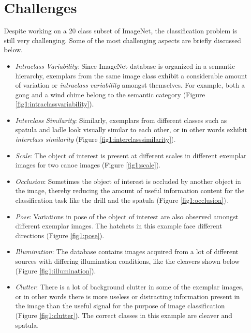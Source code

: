 \documentclass[12pt]{article}
\begin{document}
\section{Challenges}
Despite working on a 20 class subset of ImageNet, the classification problem is still very challenging.
Some of the most challenging aspects are briefly discussed below.

\begin{itemize}
\item \textit{Intraclass Variability}:
Since ImageNet database is organized in a semantic hierarchy, exemplars from the same image class exhibit a considerable amount of variation or \textit{intraclass variability} amongst themselves.
For example, both a gong and a wind chime belong to the semantic category (Figure \ref{fig1:intraclassvariability}).

\item \textit{Interclass Similarity}:
Similarly, exemplars from different classes such as spatula and ladle look visually similar to each other, or in other words exhibit \textit{interclass similarity} (Figure \ref{fig1:interclasssimilarity}).

\item \textit{Scale}:
The object of interest is present at different scales in different exemplar images for two canoe images (Figure \ref{fig1:scale}).

\item \textit{Occlusion}: Sometimes the object of interest is occluded by another object in the image, thereby reducing the amount of useful information content for the classification task like the drill and the spatula (Figure \ref{fig1:occlusion}).

\item \textit{Pose}:
Variations in pose of the object of interest are also observed amongst different exemplar images. The hatchets in this example face different directions (Figure \ref{fig1:pose}).

\item \textit{Illumination}:
The database contains images acquired from a lot of different sources with differing illumination conditions, like the cleavers shown below (Figure \ref{fig1:illumination}).

\item \textit{Clutter}: There is a lot of background clutter in some of the exemplar images, or in other words there is more useless or distracting information present in the image than the useful signal for the purpose of image classification (Figure \ref{fig1:clutter}).
The correct classes in this example are cleaver and spatula.

\end{itemize}
\end{document}
